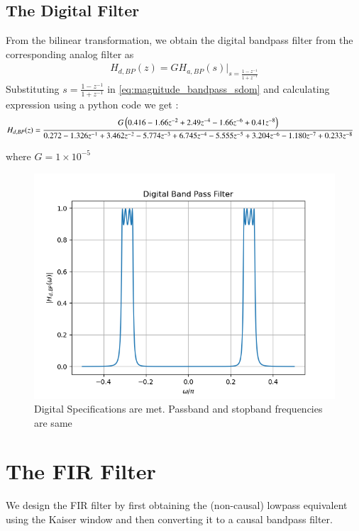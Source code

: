 \documentclass{article}
\begin{document}
\subsection{The Digital Filter}
From the bilinear transformation, we obtain the digital bandpass filter from the corresponding analog filter as
\begin{align}
    H_{d,BP}(z) = GH_{a,BP}(s)\vert_{s = \frac{1-z^{-1}}{1 + z^{-1}}}
\end{align}
Substituting $s=\frac{1-z^{-1}}{1+z^{-1}}$ in \eqref{eq:magnitude_bandpass_sdom} and calculating expression using a python code we get :
\begin{align}
    H_{d,BP}(z) &= \frac{G\left(0.416 - 1.66z^{-2} + 2.49z^{-4} - 1.66z^{-6} +0.41 z^{-8}\right)}{0.272 - 1.326z^{-1} + 3.462z^{-2} - 5.774z^{-3} + 6.745z^{-4} - 5.555z^{-5} + 3.204z^{-6} - 1.180z^{-7} + 0.233z^{-8}}
\end{align}

where $G=1\times 10^{-5}$    
\begin{figure}[H]
\centering
\includegraphics[width=1\columnwidth]{figs/Digital_BPF.png}
\caption{Digital Specifications are met. Passband and stopband frequencies are same}
\label{fig:Digital_BPF}
\end{figure}

\section{The FIR Filter}
We design the FIR filter by first obtaining the (non-causal) lowpass equivalent using the Kaiser window
and then
converting it to a causal bandpass filter.
\end{document}

